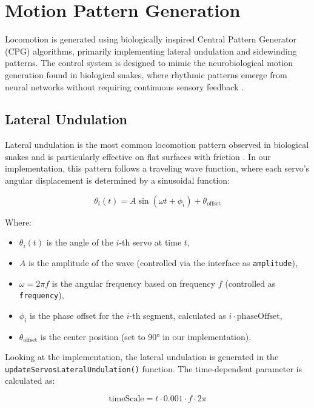 \documentclass[12pt,a4paper]{report}
\begin{document}
\section{Motion Pattern Generation}
Locomotion is generated using biologically inspired Central Pattern Generator (CPG) algorithms, primarily implementing lateral undulation and sidewinding patterns. The control system is designed to mimic the neurobiological motion generation found in biological snakes, where rhythmic patterns emerge from neural networks without requiring continuous sensory feedback \parencite{MARDER2001R986}. 

\subsection{Lateral Undulation}
Lateral undulation is the most common locomotion pattern observed in biological snakes and is particularly effective on flat surfaces with friction \parencite{transeth-2009}. In our implementation, this pattern follows a traveling wave function, where each servo's angular displacement is determined by a sinusoidal function:

\begin{equation}
\theta_i(t) = A \sin(\omega t + \phi_i) + \theta_{\text{offset}}
\end{equation}

Where:
\begin{itemize}
    \item $\theta_i(t)$ is the angle of the $i$-th servo at time $t$,
    \item $A$ is the amplitude of the wave (controlled via the interface as \texttt{amplitude}),
    \item $\omega = 2\pi f$ is the angular frequency based on frequency $f$ (controlled as \texttt{frequency}),
    \item $\phi_i$ is the phase offset for the $i$-th segment, calculated as $i \cdot \text{phaseOffset}$,
    \item $\theta_{\text{offset}}$ is the center position (set to 90° in our implementation).
\end{itemize}

Looking at the implementation, the lateral undulation is generated in the \break \texttt{updateServosLateralUndulation()} function. The time-dependent parameter is calculated as:

\begin{equation}
\text{timeScale} = t \cdot 0.001 \cdot f \cdot 2\pi
\end{equation}
\end{document}
